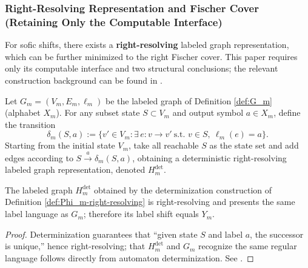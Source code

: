 \subsubsection{Right-Resolving Representation and Fischer Cover (Retaining Only the Computable Interface)}\label{subsubsec:Phi_m-right-resolving-fischer-cover}
For sofic shifts, there exists a \textbf{right-resolving} labeled graph representation, which can be further minimized to the right Fischer cover. This paper requires only its computable interface and two structural conclusions; the relevant construction background can be found in \cite{LindMarcus1995,Kitchens1998SymbolicDynamics}.

\begin{definition}\label{def:Phi_m-right-resolving}
Let $G_m=(V_m,E_m,\ell_m)$ be the labeled graph of Definition \ref{def:G_m} (alphabet $X_m$). For any subset state $S\subset V_m$ and output symbol $a\in X_m$, define the transition
\[
\delta_m(S,a):=\{v'\in V_m:\exists\,e:v\to v'\ \text{s.t. } v\in S,\ \ell_m(e)=a\}.
\]
Starting from the initial state $V_m$, take all reachable $S$ as the state set and add edges according to $S\xrightarrow{a}\delta_m(S,a)$, obtaining a deterministic right-resolving labeled graph representation, denoted $H_m^{\mathrm{det}}$.
\end{definition}

\begin{proposition}\label{prop:Phi_m-right-resolving}
The labeled graph $H_m^{\mathrm{det}}$ obtained by the determinization construction of Definition \ref{def:Phi_m-right-resolving} is right-resolving and presents the same label language as $G_m$; therefore its label shift equals $Y_m$.
\end{proposition}

\begin{proof}
Determinization guarantees that ``given state $S$ and label $a$, the successor is unique,'' hence right-resolving; that $H_m^{\mathrm{det}}$ and $G_m$ recognize the same regular language follows directly from automaton determinization. See \cite{LindMarcus1995,Kitchens1998SymbolicDynamics}.
\end{proof}
